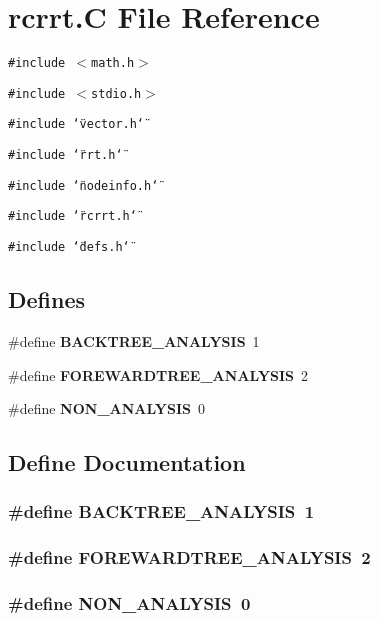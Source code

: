 \section{rcrrt.C File Reference}
\label{rcrrt_8C}
{\tt \#include $<$math.h$>$}\par
{\tt \#include $<$stdio.h$>$}\par
{\tt \#include \char`\"{}vector.h\char`\"{}}\par
{\tt \#include \char`\"{}rrt.h\char`\"{}}\par
{\tt \#include \char`\"{}nodeinfo.h\char`\"{}}\par
{\tt \#include \char`\"{}rcrrt.h\char`\"{}}\par
{\tt \#include \char`\"{}defs.h\char`\"{}}\par
\subsection*{Defines}
\begin{CompactItemize}
\item 
\#define {\bf BACKTREE\_\-ANALYSIS}\ 1
\item 
\#define {\bf FOREWARDTREE\_\-ANALYSIS}\ 2
\item 
\#define {\bf NON\_\-ANALYSIS}\ 0
\end{CompactItemize}


\subsection{Define Documentation}
\subsubsection{\setlength{\rightskip}{0pt plus 5cm}\#define BACKTREE\_\-ANALYSIS\ 1}\label{rcrrt_8C_a0}


\subsubsection{\setlength{\rightskip}{0pt plus 5cm}\#define FOREWARDTREE\_\-ANALYSIS\ 2}\label{rcrrt_8C_a1}


\subsubsection{\setlength{\rightskip}{0pt plus 5cm}\#define NON\_\-ANALYSIS\ 0}\label{rcrrt_8C_a2}


